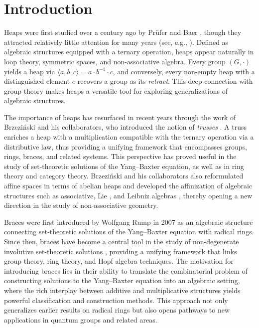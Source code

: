 \documentclass[14pt]{article}
\theoremstyle{Definition}
\theoremstyle{remark}
\begin{document}
\section{Introduction}

Heaps were first studied over a century ago by Prüfer \cite{Pru} and Baer \cite{Bae}, 
though they attracted relatively little attention for many years (see, e.g., \cite{Cer}). 
Defined as algebraic structures equipped with a ternary operation, heaps appear naturally 
in loop theory, symmetric spaces, and non-associative algebra. Every group $(G,\cdot)$ 
yields a heap via $\langle a,b,c\rangle = a \cdot b^{-1} \cdot c$, and conversely, every 
non-empty heap with a distinguished element $e$ recovers a group as its \emph{retract}.
This deep connection with group theory makes heaps a versatile tool for exploring 
generalizations of algebraic structures.

The importance of heaps has resurfaced in recent years through the work of Brzeziński and his collaborators, 
who introduced the notion of \emph{trusses} \cite{Br}. A truss enriches a heap with 
a multiplication compatible with the ternary operation via a distributive law, thus 
providing a unifying framework that encompasses groups, rings, braces, and related systems. 
This perspective has proved useful in the study of set-theoretic solutions of the 
Yang--Baxter equation, as well as in ring theory and category theory. Brzeziński and his collaborators \cite{BBRS} also 
reformulated affine spaces in terms of abelian heaps and developed the affinization of 
algebraic structures such as associative, Lie \cite{BBR}, and Leibniz algebras \cite{BRP}, thereby opening a 
new direction in the study of non-associative geometry.

Braces were first introduced by Wolfgang Rump \cite{Rump} in 2007 as an algebraic structure connecting set-theoretic solutions of the Yang–Baxter equation with radical rings. Since then, braces have become a central tool in the study of non-degenerate involutive set-theoretic solutions \cite{Ced}, providing a unifying framework that links group theory, ring theory, and Hopf algebra techniques. The motivation for introducing braces lies in their ability to translate the combinatorial problem of constructing solutions to the Yang–Baxter equation into an algebraic setting, where the rich interplay between additive and multiplicative structures yields powerful classification and construction methods. This approach not only generalizes earlier results on radical rings but also opens pathways to new applications in quantum groups and related areas.
\end{document}
